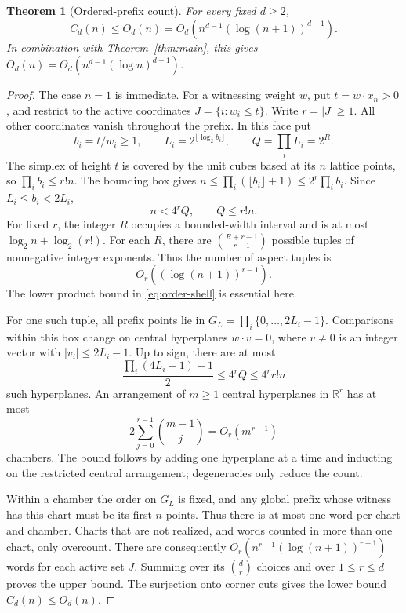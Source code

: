 \documentclass[11pt,a4paper]{article}
\newtheorem{theorem}{Theorem}
\theoremstyle{remark}
\newcommand{\R}{\mathbb R}
\newcommand{\card}[1]{\lvert#1\rvert}
\newcommand{\floor}[1]{\lfloor#1\rfloor}
\begin{document}
\begin{theorem}[Ordered-prefix count]\label{thm:orders}
For every fixed \(d\geq2\),
\[
 C_d(n)\leq O_d(n)=O_d\!\left(n^{d-1}(\log(n+1))^{d-1}\right).
\]
In combination with Theorem~\ref{thm:main}, this gives
\(O_d(n)=\Theta_d(n^{d-1}(\log n)^{d-1})\).
\end{theorem}
\begin{proof}
The case \(n=1\) is immediate. For a witnessing weight \(w\), put
\(t=w\cdot x_n>0\), and restrict to the active coordinates
\(J=\{i:w_i\leq t\}\). Write \(r=\card J\geq1\).
All other coordinates vanish throughout the prefix. In this face put
\[
 b_i=t/w_i\geq1,\qquad
 L_i=2^{\floor{\log_2 b_i}},\qquad Q=\prod_iL_i=2^R.
\]
The simplex of height \(t\) is covered by the unit cubes based at its
\(n\) lattice points, so \(\prod_i b_i\leq r!n\).
The bounding box gives
\(n\leq\prod_i(\floor{b_i}+1)\leq2^r\prod_i b_i\).
Since \(L_i\leq b_i<2L_i\),
\[
 n<4^rQ,\qquad Q\leq r!n.                    \tag{14}\label{eq:order-shell}
\]
For fixed \(r\), the integer \(R\) occupies a bounded-width interval
and is at most \(\log_2n+\log_2(r!)\).
For each \(R\), there are \(\binom{R+r-1}{r-1}\) possible tuples
of nonnegative integer exponents. Thus the number of aspect tuples is
\[
 O_r\!\left((\log(n+1))^{r-1}\right).
\]
The lower
product bound in \eqref{eq:order-shell} is essential here.

For one such tuple, all prefix points lie in
\(G_L=\prod_i\{0,\ldots,2L_i-1\}\).
Comparisons within this box change on central hyperplanes
\(w\cdot v=0\), where \(v\ne0\) is an integer vector with
\(\lvert v_i\rvert\leq2L_i-1\). Up to sign, there are at most
\[
 \frac{\prod_i(4L_i-1)-1}{2}\leq4^rQ\leq4^rr!n
\]
such hyperplanes. An arrangement of \(m\geq1\) central hyperplanes in
\(\R^r\) has at most
\[
 2\sum_{j=0}^{r-1}\binom{m-1}{j}=O_r(m^{r-1})
\]
chambers.
The bound follows by adding one hyperplane at a time and inducting on
the restricted central arrangement; degeneracies only reduce the count.

Within a chamber the order on \(G_L\) is fixed, and any global prefix
whose witness has this chart must be its first \(n\) points.
Thus there is at most one word per chart and chamber. Charts that are
not realized, and words counted in more than one chart, only overcount.
There are consequently
\(O_r(n^{r-1}(\log(n+1))^{r-1})\) words for each active set \(J\).
Summing over its \(\binom dr\) choices and over \(1\leq r\leq d\)
proves the upper bound. The surjection onto corner cuts gives the lower
bound \(C_d(n)\leq O_d(n)\).
\end{proof}
\end{document}
